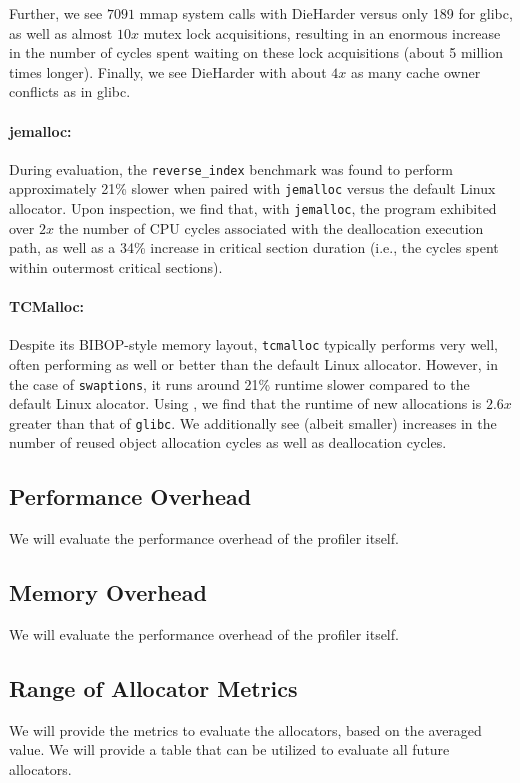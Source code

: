 	Further, we see $7091$ mmap system calls with DieHarder versus only 189 for glibc, as well as almost $10x$ mutex lock acquisitions, resulting in an enormous increase in the number of cycles spent waiting on these lock acquisitions (about 5 million times longer).
	Finally, we see DieHarder with about $4x$ as many cache owner conflicts as in glibc.

\paragraph{jemalloc:}
During evaluation, the \texttt{reverse\_index} benchmark was found to perform approximately 21\% slower when paired with \texttt{jemalloc} versus the default Linux allocator. Upon inspection, we find that, with \texttt{jemalloc}, the program exhibited over $2x$ the number of CPU cycles associated with the deallocation execution path, as well as a 34\% increase in critical section duration (i.e., the cycles spent within outermost critical sections).

\paragraph{TCMalloc:}
Despite its BIBOP-style memory layout, \texttt{tcmalloc} typically performs very well, often performing as well or better than the default Linux allocator. However, in the case of \texttt{swaptions}, it runs around 21\% runtime slower compared to the default Linux alocator. Using \MP{}, we find that the runtime of new allocations  is $2.6x$ greater than that of \texttt{glibc}. We additionally see (albeit smaller) increases in the number of reused object allocation cycles as well as deallocation cycles.



\subsection{Performance Overhead}
\label{sec:perf}

We will evaluate the performance overhead of the profiler itself. 

\subsection{Memory Overhead}
\label{sec:memory}

We will evaluate the performance overhead of the profiler itself. 

\subsection{Range of Allocator Metrics}
We will provide the metrics to evaluate the allocators, based on the averaged value. 
We will provide a table that can be utilized to evaluate all future allocators. 

